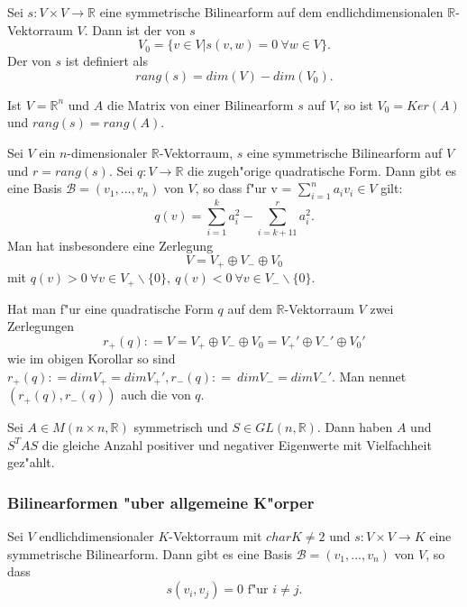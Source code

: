 \documentclass[11pt, a4paper]{article}
\begin{document}
\begin{definition} Sei $s : V \times V \rightarrow \mathbb{R}$ eine symmetrische Bilinearform auf dem endlichdimensionalen $\mathbb{R}$-Vektorraum $V$. Dann ist der  von $s$ 
$$
V_0 = \{ v \in V | s(v, w) = 0 \ \forall w \in V \}.
$$
Der  von $s$ ist definiert als
$$
rang(s) = dim (V) - dim (V_0).
$$
\end{definition}

\begin{remark} Ist $V = \mathbb{R}^n$ und $A$ die Matrix von einer Bilinearform $s$ auf $V$, so ist $V_0 = Ker(A)$ und $rang(s) = rang(A)$.
\end{remark}

\begin{corollary}
Sei $V$ ein $n$-dimensionaler $\mathbb{R}$-Vektorraum, $s$ eine symmetrische Bilinearform auf $V$ und $r = rang(s)$. Sei $q : V \rightarrow \mathbb{R}$ die zugeh"orige quadratische Form.
Dann gibt es eine Basis $\mathcal{B} = (v_1, ..., v_n)$ von $V$, so dass f"ur v = $\sum\limits_{i=1}^n a_iv_i \in V$ gilt:
$$
q(v) = \sum\limits_{i=1}^k a_i^2 - \sum\limits_{i=k + 11}^r a_i^2.
$$
Man hat insbesondere eine Zerlegung
$$
V = V_+ \oplus V_- \oplus V_0
$$
mit $q(v) > 0 \ \forall v \in V_+ \backslash \{0\}, \ q(v) < 0 \ \forall v \in V_- \backslash \{0\}.$
\end{corollary}

\begin{theorem} 
Hat man f"ur eine quadratische Form $q$ auf dem $\mathbb{R}$-Vektorraum $V$ zwei Zerlegungen 
$$
r_+(q) : = V = V_+ \oplus V_- \oplus V_0 =  V_+' \oplus V_-' \oplus V_0 '
$$
wie im obigen Korollar so sind $r_+(q) : =  dim V_+ = dim V_+ ', r_-(q) : = \ dim V_- = dim V_-'$. Man nennet $(r_+(q), r_-(q))$ auch die  von $q$.
\end{theorem}

\begin{corollary}
Sei $A \in M(n \times n, \mathbb{R})$ symmetrisch und $S \in GL(n, \mathbb{R})$. Dann haben $A$ und $S^T A S$ die gleiche Anzahl positiver und negativer Eigenwerte mit Vielfachheit gez"ahlt.
\end{corollary}

\subsubsection{Bilinearformen "uber allgemeine K"orper}
\begin{theorem} 
Sei $V$ endlichdimensionaler $K$-Vektorraum mit $char K \neq 2$ und $s : V \times V \rightarrow K$ eine symmetrische Bilinearform. Dann gibt es eine Basis $\mathcal{B} = (v_1, ..., v_n)$ von $V$, so dass
$$
s(v_i, v_j) = 0 \text{ f"ur } i \neq j.
$$
\end{theorem}
\end{document}

